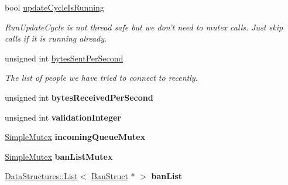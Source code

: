 \begin{DoxyCompactItemize}
\item 
\hypertarget{class_rak_net_1_1_rak_peer_af4ed36c02a71245b4159ddee3be909a1}{bool \hyperlink{class_rak_net_1_1_rak_peer_af4ed36c02a71245b4159ddee3be909a1}{update\-Cycle\-Is\-Running}}\label{class_rak_net_1_1_rak_peer_af4ed36c02a71245b4159ddee3be909a1}

\begin{DoxyCompactList}\small\item\em Run\-Update\-Cycle is not thread safe but we don't need to mutex calls. Just skip calls if it is running already. \end{DoxyCompactList}\item 
unsigned int \hyperlink{class_rak_net_1_1_rak_peer_a031ec9044cab71ff6f0ecc3b60e21b76}{bytes\-Sent\-Per\-Second}
\begin{DoxyCompactList}\small\item\em The list of people we have tried to connect to recently. \end{DoxyCompactList}\item 
\hypertarget{class_rak_net_1_1_rak_peer_a1494300e13cc4f14917d6680fc4e003a}{unsigned int {\bfseries bytes\-Received\-Per\-Second}}\label{class_rak_net_1_1_rak_peer_a1494300e13cc4f14917d6680fc4e003a}

\item 
\hypertarget{class_rak_net_1_1_rak_peer_a4b6268ad22aabb8bde56e3abfcd1dc9c}{unsigned int {\bfseries validation\-Integer}}\label{class_rak_net_1_1_rak_peer_a4b6268ad22aabb8bde56e3abfcd1dc9c}

\item 
\hypertarget{class_rak_net_1_1_rak_peer_aced0cf566fbab1b915121f7156793983}{\hyperlink{class_rak_net_1_1_simple_mutex}{Simple\-Mutex} {\bfseries incoming\-Queue\-Mutex}}\label{class_rak_net_1_1_rak_peer_aced0cf566fbab1b915121f7156793983}

\item 
\hypertarget{class_rak_net_1_1_rak_peer_ac0c2edfdb70108fda3830417ab3680ae}{\hyperlink{class_rak_net_1_1_simple_mutex}{Simple\-Mutex} {\bfseries ban\-List\-Mutex}}\label{class_rak_net_1_1_rak_peer_ac0c2edfdb70108fda3830417ab3680ae}

\item 
\hypertarget{class_rak_net_1_1_rak_peer_a47cf5638777f17d9f86214df224b3755}{\hyperlink{class_data_structures_1_1_list}{Data\-Structures\-::\-List}$<$ \hyperlink{struct_rak_net_1_1_rak_peer_1_1_ban_struct}{Ban\-Struct} $\ast$ $>$ {\bfseries ban\-List}}\label{class_rak_net_1_1_rak_peer_a47cf5638777f17d9f86214df224b3755}


\end{DoxyCompactItemize}
